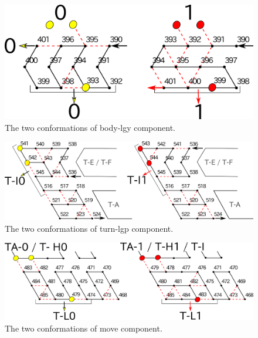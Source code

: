 \documentclass[runningheads]{llncs}
\begin{document}
\begin{figure}[h]
\centering
\includegraphics[width=0.5\linewidth]{pic/body-lgy.png}
\caption{The two conformations of body-lgy component.}
\label{fig:body-lgy}
\end{figure}

\begin{figure}[h]
\centering
\includegraphics[width=0.7\linewidth]{pic/turn-lgp.png}
\caption{The two conformations of turn-lgp component.}
\label{fig:turn-lgp}
\end{figure}


\begin{figure}[h]
\centering
\includegraphics[width=0.7\linewidth]{pic/move.png}
\caption{The two conformations of move component.}
\label{fig:move}
\end{figure}
\end{document}
